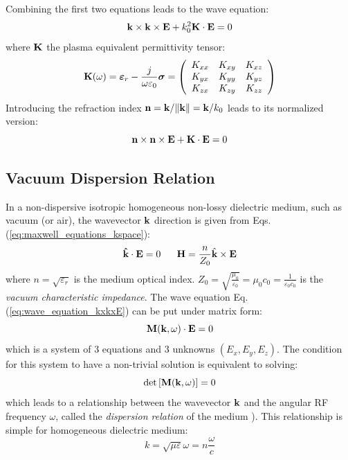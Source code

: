 Combining the first two equations leads to the wave equation:
\begin{equation}
{\mathbf k} \times {\mathbf k} \times {\mathbf E} + k_0^2 {\mathbf K} \cdot {\mathbf E} = 0
\label{eq:wave_equation_kxkxE}
\end{equation}
where ${\mathbf K}$ the plasma equivalent permittivity tensor:
\begin{equation}
{\mathbf K}(\omega) =  
\boldsymbol{\varepsilon}_r - \frac{j}{\omega \varepsilon_0} \boldsymbol{\sigma}
=
\left(
\begin{array}{ccc}
K_{xx} & K_{xy} & K_{xz} \\
K_{yx} & K_{yy} & K_{yz} \\
K_{zx} & K_{zy} & K_{zz} \\
\end{array}
\right)
\end{equation}  
Introducing the refraction index ${\mathbf n} = {\mathbf k} / \norm{{\mathbf k}} = {\mathbf k}/k_0$ leads to its normalized version:
\begin{equation}
{\mathbf n} \times {\mathbf n} \times {\mathbf E} + {\mathbf K} \cdot {\mathbf E} = 0
\label{eq:wave_equation_nxnxE}
\end{equation}



\subsection{Vacuum Dispersion Relation}
In a non-dispersive isotropic homogeneous non-lossy dielectric medium, such as vacuum (or air), the wavevector ${\mathbf k}$ direction is given from Eqs.(\ref{eq:maxwell_equations_kspace}):
\begin{equation}
\mathbf{\hat{k}}\cdot\mathbf{E}=0
\;\;\;\;\;\;
\mathbf{H}=\frac{n}{Z_{0}}\hat{{\mathbf k}}\times\mathbf{E}\label{eq:vecteur_onde_vide}
\end{equation}
where $n=\sqrt{\varepsilon_{r}}$ is the medium optical index. $Z_{0}=\sqrt{\frac{\mu_{0}}{\varepsilon_{0}}}=\mu_{0}c_{0}=\frac{1}{\varepsilon_{0}c_{0}}$ is the \emph{vacuum characteristic impedance}. The wave equation Eq.(\ref{eq:wave_equation_kxkxE}) can be put under matrix form:
\begin{equation}
\mathbf{M}({\mathbf k}, \omega) \cdot {\mathbf E} = 0
\end{equation}
which is a system of 3 equations and 3 unknowns $(E_{x},E_{y},E_{z})$. The condition for this system to have a non-trivial solution is equivalent to solving:
\begin{equation}
\det\left[\mathbf{M}({\mathbf k}, \omega)\right] =  0
\end{equation}
which leads to a relationship between the wavevector ${\mathbf k}$ and the angular RF frequency $\omega$, called the \textit{dispersion relation} of the medium \cite[§4]{rothwell2018}). This relationship is simple for homogeneous dielectric medium:
\begin{equation}
k = \sqrt{\mu\varepsilon}\omega = n \frac{\omega}{c}
\end{equation}


